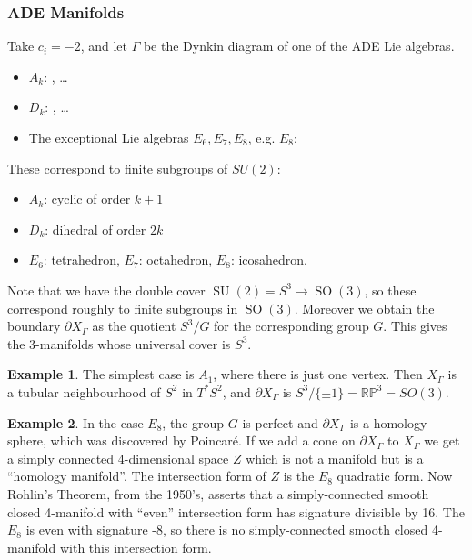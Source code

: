\documentclass{article}
\theoremstyle{definition}
\newtheorem*{example}{Example}
\DeclareMathOperator{\SO}{SO}
\DeclareMathOperator{\SU}{SU}
\newcommand{\RP}{\mathbb{RP}}
\begin{document}
\subsubsection*{ADE Manifolds}

Take $c_i=-2$, and let $\Gamma$ be the Dynkin diagram of one of the ADE Lie
algebras.
\begin{itemize}
    \item $A_k$: , \ldots
    \item $D_k$: , \ldots
    \item The exceptional Lie algebras $E_6,E_7,E_8$, e.g. $E_8$: 
\end{itemize}
These correspond to finite subgroups of $SU(2)$:
\begin{itemize}
    \item $A_k$: cyclic of order $k+1$
    \item $D_k$: dihedral of order $2k$
    \item $E_6$: tetrahedron, $E_7$: octahedron, $E_8$: icosahedron.
\end{itemize}
Note that we have the double cover $\SU(2)=S^3\to\SO(3)$, so these correspond
roughly to finite subgroups in $\SO(3)$. Moreover we obtain the boundary
$\partial X_\Gamma$ as the quotient $S^3/G$ for the corresponding group $G$.
This gives the 3-manifolds whose universal cover is $S^3$.

\begin{example}
    The simplest case is $A_1$, where there is just one vertex. Then $X_\Gamma$
    is a tubular neighbourhood of $S^2$ in $T^*S^2$, and $\partial X_\Gamma$ is
    $S^3/\{\pm1\}=\RP^3=SO(3)$.
\end{example}

\begin{example}
    In the case $E_8$, the group $G$ is perfect and $\partial X_\Gamma$ is a 
    homology sphere, which was discovered by Poincar\'e. If we add a cone on
    $\partial X_\Gamma$ to $X_\Gamma$ we get a simply connected 4-dimensional
    space $Z$ which is not a manifold but is a ``homology manifold''. The
    intersection form of $Z$ is the $E_8$ quadratic form. Now Rohlin's Theorem,
    from the 1950's, asserts that a simply-connected smooth closed 4-manifold
    with ``even'' intersection form has signature divisible by 16. The $E_8$
    is even with signature -8, so there is no simply-connected smooth closed
    4-manifold with this intersection form.
\end{example}
\end{document}
